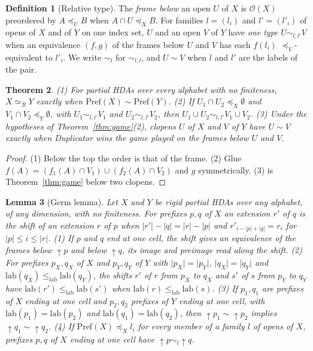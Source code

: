 \documentclass{lmcs}
\newtheorem{theorem}{Theorem}[section]
\newtheorem{lemma}[theorem]{Lemma}
\theoremstyle{definition}
\newtheorem{definition}[theorem]{Definition}
\theoremstyle{remark}
\newcommand{\Op}{\mathcal{O}}
\newcommand{\dimn}[1]{\lvert #1\rvert}
\newcommand{\Pref}{\mathrm{Pref}}
\newcommand{\fle}[1]{\preceq_{#1}}
\newcommand{\upc}[1]{{\uparrow}#1}
\newcommand{\lab}{\mathrm{lab}}
\newcommand{\lle}{\leq_{\mathrm{lab}}}
\providecommand{\tyl}[1]{\sim_{#1}}
\providecommand{\tyeq}{\sim}
\providecommand{\lab}{\mathrm{lab}}
\providecommand{\eqB}{\simeq_{\mathcal{B}}}
\begin{document}
\begin{definition}[Relative type]\label{def:type}
The \emph{frame below} an open $U$ of $X$ is $\Op(X)$ preordered by $A\fle{U}B$ when $A\cap U\fle{X}B$. For families
$l=(l_i)$ and $l'=(l'_i)$ of opens of $X$ and of $Y$ on one index set, $U$ and an open $V$ of $Y$ have \emph{one type}
$U\tyl{l,l'}V$ when an equivalence $(f,g)$ of the frames below $U$ and $V$ has each $f(l_i)$ $\fle{V}$-equivalent to
$l'_i$. We write $\tyl{l}$ for $\tyl{l,l}$, and $U\tyeq V$ when $l$ and $l'$ are the labels of the pair.
\end{definition}

\begin{theorem}\label{thm:types}
(1) For partial HDAs over every alphabet with no finiteness, $X\eqB Y$ exactly when
$\Pref(X)\tyeq\Pref(Y)$. (2) If $U_1\cap U_2\fle{X}\emptyset$ and
$V_1\cap V_2\fle{Y}\emptyset$, with $U_1\tyl{l,l'}V_1$ and $U_2\tyl{l,l'}V_2$, then $U_1\cup U_2\tyl{l,l'}V_1\cup
V_2$. (3) Under the hypotheses of Theorem~\ref{thm:game}(2), clopens $U$ of $X$ and $V$ of
$Y$ have $U\tyeq V$ exactly when Duplicator wins the game played on the frames below $U$ and
$V$.
\end{theorem}

\begin{proof}
(1) Below the top the order is that of the frame. (2) Glue $f(A)=(f_1(A)\cap
V_1)\cup(f_2(A)\cap V_2)$ and $g$ symmetrically. (3) is Theorem~\ref{thm:game} below two
clopens.
\end{proof}

\begin{lemma}[Germ lemma]\label{lem:germ}\label{prop:dec-germ}
Let $X$ and $Y$ be rigid partial HDAs over any alphabet, of any dimension, with no finiteness. For prefixes $p,q$ of $X$
an extension $r'$ of $q$ is the \emph{shift} of an extension $r$ of $p$ when $\dimn{r'}-\dimn{q}=\dimn{r}-\dimn{p}$ and
$r'_{i-\dimn{p}+\dimn{q}}=r_i$ for $\dimn{p}\leq i\leq\dimn{r}$.
(1) If $p$ and $q$ end at one cell, the shift gives an equivalence of the frames below $\upc{p}$ and below $\upc{q}$,
its image and preimage read along the shift.
(2) For prefixes $p_X,q_X$ of $X$ and $p_Y,q_Y$ of $Y$ with $\dimn{p_X}=\dimn{p_Y}$, $\dimn{q_X}=\dimn{q_Y}$ and
$\lab(q_X)\lle\lab(q_Y)$, the shifts $r'$ of $r$ from $p_X$ to $q_X$ and $s'$ of $s$ from $p_Y$ to $q_Y$ have
$\lab(r')\lle\lab(s')$ when $\lab(r)\lle\lab(s)$.
(3) If $p_1,q_1$ are prefixes of $X$ ending at one cell and $p_2,q_2$ prefixes of $Y$ ending at one cell, with
$\lab(p_1)=\lab(p_2)$ and $\lab(q_1)=\lab(q_2)$, then $\upc{p_1}\tyeq\upc{p_2}$ implies
$\upc{q_1}\tyeq\upc{q_2}$.
(4) If $\Pref(X)\fle{X}l_i$ for every member of a family $l$ of opens of $X$, prefixes $p,q$ of $X$ ending at one cell
have $\upc{p}\tyl{l}\upc{q}$.
\end{lemma}
\end{document}

